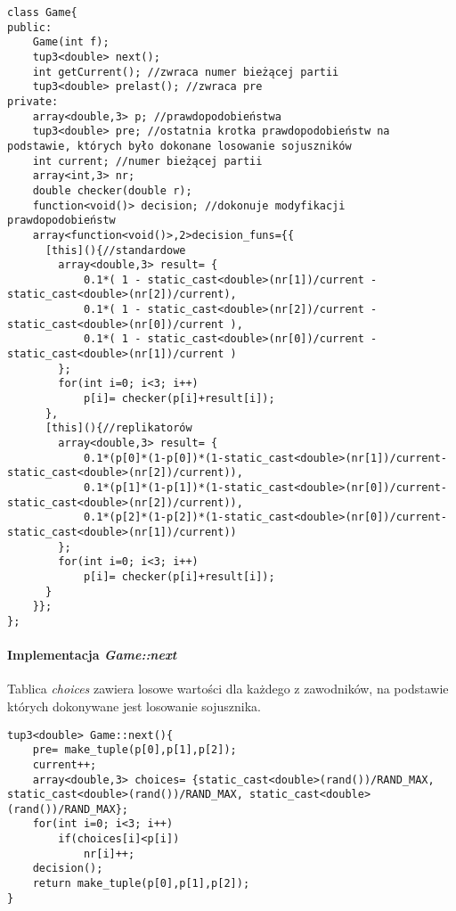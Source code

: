 \begin{lstlisting}
class Game{
public:
    Game(int f);
    tup3<double> next();
    int getCurrent(); //zwraca numer bieżącej partii
    tup3<double> prelast(); //zwraca pre
private:
    array<double,3> p; //prawdopodobieństwa
    tup3<double> pre; //ostatnia krotka prawdopodobieństw na podstawie, których było dokonane losowanie sojuszników
    int current; //numer bieżącej partii
    array<int,3> nr;
    double checker(double r);
    function<void()> decision; //dokonuje modyfikacji prawdopodobieństw
    array<function<void()>,2>decision_funs={{
      [this](){//standardowe
        array<double,3> result= {
            0.1*( 1 - static_cast<double>(nr[1])/current - static_cast<double>(nr[2])/current),
            0.1*( 1 - static_cast<double>(nr[2])/current - static_cast<double>(nr[0])/current ),
            0.1*( 1 - static_cast<double>(nr[0])/current - static_cast<double>(nr[1])/current )
        };
        for(int i=0; i<3; i++)
            p[i]= checker(p[i]+result[i]);
      },
      [this](){//replikatorów
        array<double,3> result= {
            0.1*(p[0]*(1-p[0])*(1-static_cast<double>(nr[1])/current-static_cast<double>(nr[2])/current)),
            0.1*(p[1]*(1-p[1])*(1-static_cast<double>(nr[0])/current-static_cast<double>(nr[2])/current)),
            0.1*(p[2]*(1-p[2])*(1-static_cast<double>(nr[0])/current-static_cast<double>(nr[1])/current))
        };
        for(int i=0; i<3; i++)
            p[i]= checker(p[i]+result[i]);
      }
    }};
};
\end{lstlisting}

\paragraph{Implementacja \textit{Game::next}}
Tablica \textit{choices} zawiera losowe wartości dla każdego z zawodników, na podstawie których dokonywane jest losowanie sojusznika.
\begin{lstlisting}
tup3<double> Game::next(){
    pre= make_tuple(p[0],p[1],p[2]);
    current++;
    array<double,3> choices= {static_cast<double>(rand())/RAND_MAX, static_cast<double>(rand())/RAND_MAX, static_cast<double>(rand())/RAND_MAX};
    for(int i=0; i<3; i++)
        if(choices[i]<p[i])
            nr[i]++;
    decision();
    return make_tuple(p[0],p[1],p[2]);
}
\end{lstlisting}


